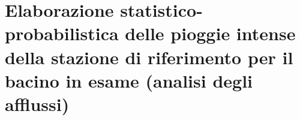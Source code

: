 \section{Elaborazione statistico-probabilistica delle pioggie intense della stazione di riferimento per il bacino in esame (analisi degli afflussi)}